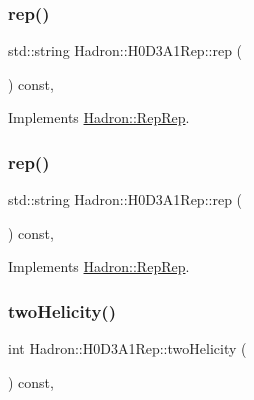 \subsubsection{\texorpdfstring{rep()}{rep()}\hspace{0.1cm}{\footnotesize\ttfamily [2/3]}}
{\footnotesize\ttfamily std\+::string Hadron\+::\+H0\+D3\+A1\+Rep\+::rep (\begin{DoxyParamCaption}{ }\end{DoxyParamCaption}) const\hspace{0.3cm}{\ttfamily [inline]}, {\ttfamily [virtual]}}



Implements \mbox{\hyperlink{structHadron_1_1RepRep_ab3213025f6de249f7095892109575fde}{Hadron\+::\+Rep\+Rep}}.

\mbox{\label{structHadron_1_1H0D3A1Rep_a5dae40cb41876bf42a5c9f65ffd5f222}} 
\subsubsection{\texorpdfstring{rep()}{rep()}\hspace{0.1cm}{\footnotesize\ttfamily [3/3]}}
{\footnotesize\ttfamily std\+::string Hadron\+::\+H0\+D3\+A1\+Rep\+::rep (\begin{DoxyParamCaption}{ }\end{DoxyParamCaption}) const\hspace{0.3cm}{\ttfamily [inline]}, {\ttfamily [virtual]}}



Implements \mbox{\hyperlink{structHadron_1_1RepRep_ab3213025f6de249f7095892109575fde}{Hadron\+::\+Rep\+Rep}}.

\mbox{\label{structHadron_1_1H0D3A1Rep_a2a2524dad4c9988ef8a9ffb9a5ffa576}} 
\subsubsection{\texorpdfstring{twoHelicity()}{twoHelicity()}\hspace{0.1cm}{\footnotesize\ttfamily [1/2]}}
{\footnotesize\ttfamily int Hadron\+::\+H0\+D3\+A1\+Rep\+::two\+Helicity (\begin{DoxyParamCaption}{ }\end{DoxyParamCaption}) const\hspace{0.3cm}{\ttfamily [inline]}, {\ttfamily [virtual]}}

